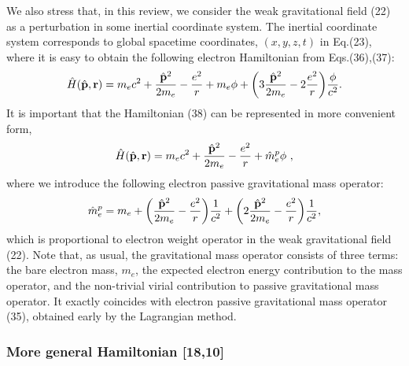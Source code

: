 \documentclass{ws-ijmpd}
\begin{document}
We also stress that, in this review, we consider the weak
gravitational field (22) as a perturbation in some inertial
coordinate system. The inertial coordinate system corresponds to
global spacetime coordinates, $(x,y,z,t)$ in Eq.(23), where it is
easy to obtain the following electron Hamiltonian from
Eqs.(36),(37):
\begin{equation}
\hat H(\hat {\bf p},{\bf r}) = m_e c^2 + \frac{\hat {\bf
p}^2}{2m_e}-\frac{e^2}{r} + m_e  \phi + \biggl( 3 \frac{\hat {\bf
p}^2}{2 m_e} -2\frac{e^2}{r} \biggl) \frac{\phi}{c^2}.
\end{equation}
It is important that the Hamiltonian (38) can be represented in
more convenient form,
\begin{equation}
\hat H(\hat {\bf p},{\bf r}) = m_e c^2 + \frac{\hat {\bf
p}^2}{2m_e} -\frac{e^2}{r} + \hat m^p_e \phi 
\ ,
\end{equation}
where we introduce the following electron passive gravitational
mass operator:
\begin{equation}
\hat m^p_e   = m_e  + \biggl(\frac{\hat {\bf
p}^2}{2m_e} -\frac{e^2}{r}\biggl) \frac{1}{c^2} + \biggl(2
\frac{\hat {\bf p}^2}{2m_e}-\frac{e^2}{r} \biggl) \frac{1}{c^2} ,
\end{equation}
which is proportional to electron weight operator in the weak
gravitational field (22). Note that, as usual, the gravitational mass
operator consists of three terms: the bare electron mass, $m_e$,
the expected electron energy contribution to the mass operator,
and the non-trivial virial contribution to passive gravitational
mass operator. It exactly coincides with electron passive gravitational
mass operator (35), obtained early by the Lagrangian method.


\subsubsection{More general Hamiltonian [18,10]}
\end{document}
